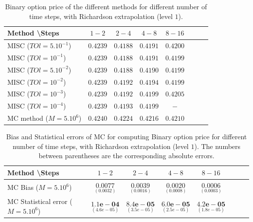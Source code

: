 \documentclass[11pt]{article}
\begin{document}
\begin{table}[h!]
	\centering
	\begin{tabular}{l*{6}{c}r}
		Method \textbackslash  Steps            & $1-2$ & $2-4$ & $4-8$ & $8-16$ &   \\
		\hline
		MISC ($TOl=5.10^{-1}$)  & $0.4239$ & $0.4188$ & $0.4191$ & $0.4200$  \\
		MISC ($TOl=10^{-1}$)  &$0.4239$ & $0.4188$ &$0.4191$ & $0.4199$  \\
		MISC ($TOl=5.10^{-2}$) & $0.4239$ & $0.4188$ & $0.4190$ & $0.4199$  \\
		MISC ($TOl=10^{-2}$) &$0.4239$ & $0.4192$ & $0.4194$ & $0.4199$  \\
		MISC ($TOl=10^{-3}$) & $0.4239$ & $0.4192$ & $0.4199$ & $0.4205$  \\
			MISC ($TOl=10^{-4}$) & $0.4239$ & $0.4193$ & $0.4199$ & $-$  \\
		\hline
		MC method ($M=5.10^{6}$)   & $ 0.4240$ & $
		0.4224$ & $    0.4216$ & $  0.4210$  \\
		\hline
	\end{tabular}
	\caption{Binary option price of the different methods for different number of time steps, with Richardson extrapolation (level $1$).}
	\label{table: Binary option price of the different methods for different number of time steps, with Richardson extrapolation (level1).}
\end{table}


\begin{table}[h!]
	\centering
	\begin{tabular}{l*{6}{c}r}
		Method \textbackslash  Steps            & $1-2$ & $2-4$ & $4-8$ & $8-16$  \\
		\hline
	MC Bias  ($M=5.10^{6}$)&$ \underset{(0.0032)}{\mathbf{0.0077}}$    & $\underset{(    0.0016
		)}{\mathbf{0.0039}}$  & $\underset{(0.0008)}{\mathbf{0.0020}}$  & $\underset{(0.0003)}{\mathbf{0.0006}}$\\
		MC Statistical error   ($M=5.10^{6}$)   & 	$ \underset{( 4.6e-05  )}{\mathbf{1.1e-04}}$  & $\underset{(3.5e-05)}{\mathbf{ 8.4e-05
	}}$  & $\underset{(2.5e-05)}{\mathbf{6.0e-05}}$ & $\underset{(   1.8e-05 )}{\mathbf{  4.2e-05 }}$\\ 
		
%		
		\hline
	\end{tabular}
	\caption{Bias and Statistical errors of MC  for computing Binary option price  for different number of time steps, with Richardson extrapolation (level $1$). The numbers between parentheses are the corresponding absolute errors.}
	\label{Bias and Statistical errors of MC  for computing Binary option price  for different number of time steps, with Richardson extrapolation (level $1$). The numbers between parentheses are the corresponding absolute errors.}
\end{table}
\end{document}
